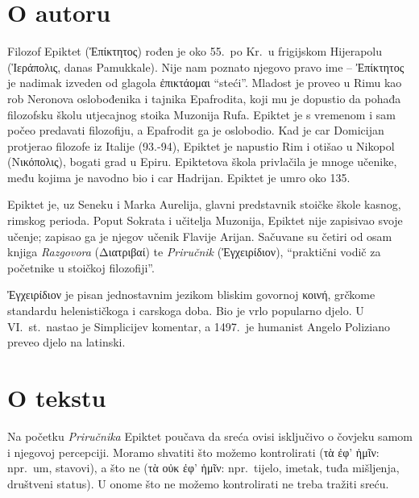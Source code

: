 \section*{O autoru}

Filozof Epiktet \textgreek[variant=ancient]{(Ἐπίκτητος)} rođen je oko 55.\ po Kr.\ u frigijskom Hijerapolu \textgreek[variant=ancient]{(Ἱεράπολις,} danas Pamukkale). Nije nam poznato njegovo pravo ime – \textgreek[variant=ancient]{Ἐπίκτητος} je nadimak izveden od glagola \textgreek[variant=ancient]{ἐπικτάομαι} ``steći''. Mladost je proveo u Rimu kao rob Neronova oslobođenika i tajnika Epafrodita, koji mu je dopustio da pohađa filozofsku školu utjecajnog stoika Muzonija Rufa. Epiktet je s vremenom i sam počeo predavati filozofiju, a Epafrodit ga je oslobodio. Kad je car Domicijan protjerao filozofe iz Italije (93.-94), Epiktet je napustio Rim i otišao u Nikopol \textgreek[variant=ancient]{(Νικόπολις),} bogati grad u Epiru. Epiktetova škola privlačila je mnoge učenike, među kojima je navodno bio i car Hadrijan. Epiktet je umro oko 135. 

Epiktet je, uz Seneku i Marka Aurelija, glavni predstavnik stoičke škole kasnog, rimskog perioda. Poput Sokrata i učitelja Muzonija, Epiktet nije zapisivao svoje učenje; zapisao ga je njegov učenik Flavije Arijan. Sačuvane su četiri od osam knjiga \textit{Razgovora} \textgreek[variant=ancient]{(Διατριβαί)} te \textit{Priručnik} \textgreek[variant=ancient]{(Ἐγχειρίδιον),} ``praktični vodič za početnike u stoičkoj filozofiji''. 

\textgreek[variant=ancient]{Ἐγχειρίδιον} je pisan jednostavnim jezikom bliskim govornoj \textgreek[variant=ancient]{κοινή,} grčkome standardu helenističkoga i carskoga doba. Bio je vrlo popularno djelo. U VI.~st.\ nastao je Simplicijev komentar, a 1497.\ je humanist Angelo Poliziano preveo djelo na latinski.

\section*{O tekstu}

Na početku \textit{Priručnika} Epiktet poučava da sreća ovisi isključivo o čovjeku samom i njegovoj percepciji. Moramo shvatiti što možemo kontrolirati \textgreek[variant=ancient]{(τὰ ἐφ' ἡμῖν:} npr.\ um, stavovi), a što ne \textgreek[variant=ancient]{(τὰ οὐκ ἐφ' ἡμῖν:} npr.\ tijelo, imetak, tuđa mišljenja, društveni status). U onome što ne možemo kontrolirati ne treba tražiti sreću.


